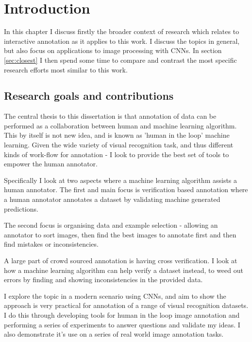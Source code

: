 


\chapter{Introduction}

In this chapter I discuss firstly the broader context of research which relates to interactive annotation as it applies to this work. I discuss the topics in general, but also focus on applications to image processing with \gls{CNN}s. In section \ref{sec:closest} I then spend some time to compare and contrast the most specific research efforts most similar to this work.

\section{Research goals and contributions}

The central thesis to this dissertation is that annotation of data can be performed as a collaboration between human and machine learning algorithm. This by itself is not new idea, and is known as 'human in the loop' machine learning. Given the wide variety of visual recognition task, and thus different kinds of work-flow for annotation - I look to provide the best set of tools to empower the human annotator.

Specifically I look at two aspects where a machine learning algorithm assists a human annotator. The first and main focus is verification based annotation where a human annotator annotates a dataset by validating machine generated predictions.

The second focus is organising data and example selection - allowing an annotator to sort images, then find the best images to annotate first and then find mistakes or inconsistencies. 

A large part of crowd sourced annotation is having cross verification. I look at how a machine learning algorithm can help verify a dataset instead, to weed out errors by finding and showing inconsistencies in the provided data.

I explore the topic in a modern scenario using \gls{CNN}s, and aim to show the approach is very practical for annotation of a range of visual recognition datasets. I do this through developing tools for human in the loop image annotation and performing a series of experiments to answer questions and validate my ideas. I also demonstrate it's use on a series of real world image annotation tasks.


